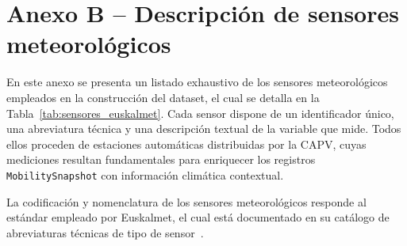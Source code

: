 \section*{Anexo B – Descripción de sensores meteorológicos}
\label{anexo:sensores}

En este anexo se presenta un listado exhaustivo de los sensores meteorológicos empleados en la construcción del dataset, el cual se detalla en la Tabla~\ref{tab:sensores_euskalmet}. Cada sensor dispone de un identificador único, una abreviatura técnica y una descripción textual de la variable que mide. Todos ellos proceden de estaciones automáticas distribuidas por la CAPV, cuyas mediciones resultan fundamentales para enriquecer los registros \texttt{MobilitySnapshot} con información climática contextual.

La codificación y nomenclatura de los sensores meteorológicos responde al estándar empleado por Euskalmet, el cual está documentado en su catálogo de abreviaturas técnicas de tipo de sensor~\cite{sensorTypeAbbrv}.

\vspace{1em}

